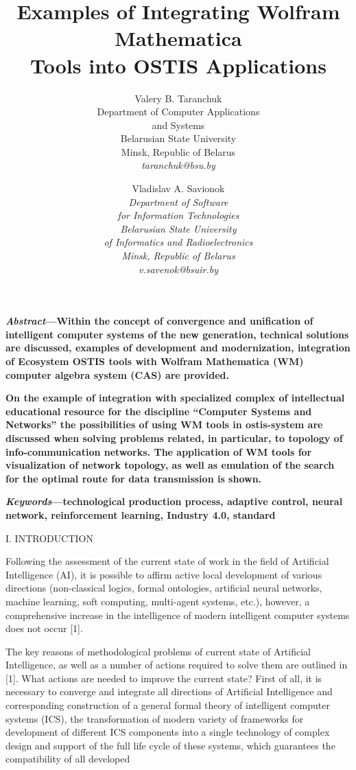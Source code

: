 \documentclass{article}
\title{\huge\bfseries Examples of Integrating Wolfram Mathematica \\ Tools into OSTIS Applications \\}
\author{
  Valery B. Taranchuk\\
 Department of Computer Applications \\ and Systems\\
 Belarusian State University\\
 Minsk, Republic of Belarus\\
\itshape taranchuk@bsu.by\\ \and
 Vladislav A. Savionok \\ 
\itshape Department of Software\\
\itshape for Information Technologies\\
 Belarusian State University \\ 
 of Informatics and Radioelectronics \\ 
 Minsk, Republic of Belarus \\ 
 v.savenok@bsuir.by}\\
\date{}
\begin{document}
\maketitle  
\begin{multicols}{2}
\textbf{\small\textit{Abstract}—Within the concept of convergence and unification of intelligent computer systems of the new generation,
technical solutions are discussed, examples of development
and modernization, integration of Ecosystem OSTIS tools
with Wolfram Mathematica (WM) computer algebra system (CAS) are provided.}
\par
\textbf{\small
On the example of integration with specialized complex
of intellectual educational resource for the discipline “Computer Systems and Networks” the possibilities of using WM tools in ostis-system are discussed when solving problems
related, in particular, to topology of info-communication
networks. The application of WM tools for visualization of
network topology, as well as emulation of the search for
the optimal route for data transmission is shown.
} \par
\small\textbf{\textit{Keywords}—technological production process, adaptive
control, neural network, reinforcement learning, Industry 4.0, standard}\\
\begin{center}
    I. INTRODUCTION \\
\end{center}
\par Following the assessment of the current state of work
in the field of Artificial Intelligence (AI), it is possible
to affirm active local development of various directions
(non-classical logics, formal ontologies, artificial neural
networks, machine learning, soft computing, multi-agent
systems, etc.), however, a comprehensive increase in the
intelligence of modern intelligent computer systems does
not occur [1].
\par The key reasons of methodological problems of current state of Artificial Intelligence, as well as a number of actions required to solve them are outlined in [1].
What actions are needed to improve the current state?
First of all, it is necessary to converge and integrate
all directions of Artificial Intelligence and corresponding
construction of a general formal theory of intelligent
computer systems (ICS), the transformation of modern
variety of frameworks for development of different ICS
components into a single technology of complex design
and support of the full life cycle of these systems,
which guarantees the compatibility of all developed

\end{multicols}
\end{document}
